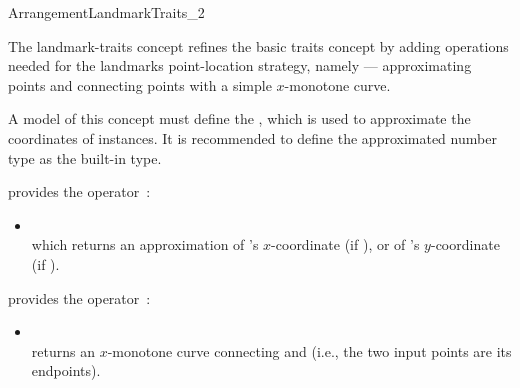 
\ccRefPageBegin

\begin{ccRefConcept}{ArrangementLandmarkTraits_2}

\ccDefinition

The landmark-traits concept refines the basic traits concept by adding
operations needed for the landmarks point-location strategy, namely ---
approximating points and connecting points with a simple $x$-monotone
curve.

A model of this concept must define the , which
is used to approximate the coordinates of  instances. It is
recommended to define the approximated number type as the built-in
 type. 

\ccRefines
{}

\ccTypes



\ccThreeToTwo

{provides the operator~:
 \begin{itemize}
 \item {} \\
 which returns an approximation of 's $x$-coordinate (if ),
 or of 's $y$-coordinate (if ).
 \end{itemize}}

{provides the operator~:
 \begin{itemize}
 \item {} \\
 returns an $x$-monotone curve connecting  and  (i.e., the
 two input points are its endpoints).
 \end{itemize}}


\end{ccRefConcept}
